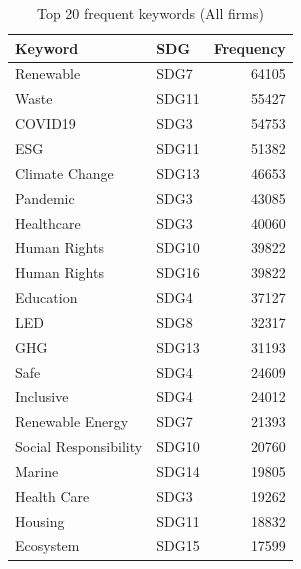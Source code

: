 \begin{table}

\caption{Top 20 frequent keywords (All firms)}
\centering
\begin{tabular}[t]{llr}
\toprule
Keyword & SDG & Frequency\\
\midrule
Renewable & SDG7 & 64105\\
Waste & SDG11 & 55427\\
COVID19 & SDG3 & 54753\\
ESG & SDG11 & 51382\\
Climate Change & SDG13 & 46653\\
\addlinespace
Pandemic & SDG3 & 43085\\
Healthcare & SDG3 & 40060\\
Human Rights & SDG10 & 39822\\
Human Rights & SDG16 & 39822\\
Education & SDG4 & 37127\\
\addlinespace
LED & SDG8 & 32317\\
GHG & SDG13 & 31193\\
Safe & SDG4 & 24609\\
Inclusive & SDG4 & 24012\\
Renewable Energy & SDG7 & 21393\\
\addlinespace
Social Responsibility & SDG10 & 20760\\
Marine & SDG14 & 19805\\
Health Care & SDG3 & 19262\\
Housing & SDG11 & 18832\\
Ecosystem & SDG15 & 17599\\
\bottomrule
\end{tabular}
\end{table}
